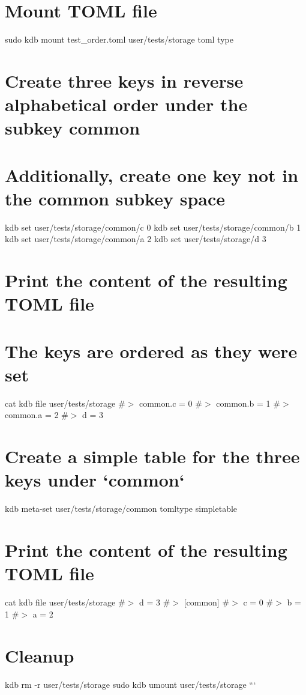  \hypertarget{autotoc_md693_autotoc_md791}{}\section{Mount T\+O\+M\+L file}\label{autotoc_md693_autotoc_md791}
sudo kdb mount test\+\_\+order.\+toml user/tests/storage toml type\hypertarget{autotoc_md693_autotoc_md792}{}\section{Create three keys in reverse alphabetical order under the subkey common}\label{autotoc_md693_autotoc_md792}
\hypertarget{autotoc_md693_autotoc_md793}{}\section{Additionally, create one key not in the common subkey space}\label{autotoc_md693_autotoc_md793}
kdb set \textquotesingle{}user/tests/storage/common/c\textquotesingle{} \textquotesingle{}0\textquotesingle{} kdb set \textquotesingle{}user/tests/storage/common/b\textquotesingle{} \textquotesingle{}1\textquotesingle{} kdb set \textquotesingle{}user/tests/storage/common/a\textquotesingle{} \textquotesingle{}2\textquotesingle{} kdb set \textquotesingle{}user/tests/storage/d\textquotesingle{} \textquotesingle{}3\textquotesingle{}\hypertarget{autotoc_md693_autotoc_md794}{}\section{Print the content of the resulting T\+O\+M\+L file}\label{autotoc_md693_autotoc_md794}
\hypertarget{autotoc_md693_autotoc_md795}{}\section{The keys are ordered as they were set}\label{autotoc_md693_autotoc_md795}
cat {\ttfamily kdb file user/tests/storage} \#$>$ common.\+c = 0 \#$>$ common.\+b = 1 \#$>$ common.\+a = 2 \#$>$ d = 3\hypertarget{autotoc_md693_autotoc_md796}{}\section{Create a simple table for the three keys under `common`}\label{autotoc_md693_autotoc_md796}
kdb meta-\/set \textquotesingle{}user/tests/storage/common\textquotesingle{} \textquotesingle{}tomltype\textquotesingle{} \textquotesingle{}simpletable\textquotesingle{}\hypertarget{autotoc_md693_autotoc_md797}{}\section{Print the content of the resulting T\+O\+M\+L file}\label{autotoc_md693_autotoc_md797}
cat {\ttfamily kdb file user/tests/storage} \#$>$ d = 3 \#$>$ \mbox{[}common\mbox{]} \#$>$ c = 0 \#$>$ b = 1 \#$>$ a = 2\hypertarget{autotoc_md693_autotoc_md798}{}\section{Cleanup}\label{autotoc_md693_autotoc_md798}
kdb rm -\/r user/tests/storage sudo kdb umount user/tests/storage ```

